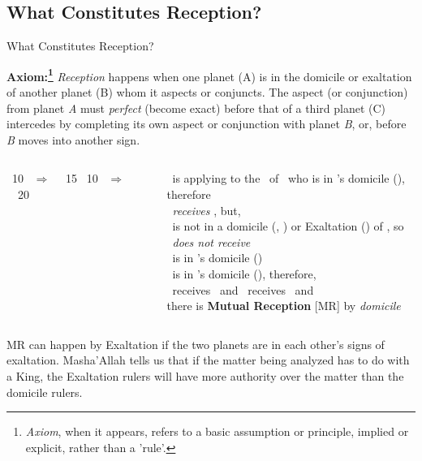\subsection{What Constitutes Reception?}
\begin{frame}[t]{What Constitutes Reception?}
\small
\begin{block}{}
\textbf{Axiom:\footnote{\textsl{Axiom}, when it appears, refers to a basic assumption or principle, implied or explicit, rather than a 'rule'.}} {
\textsl{Reception} happens when one planet (A) is in the domicile or exaltation of another planet (B) whom it aspects or conjuncts.
The aspect (or conjunction) from planet \textsl{A} must \textsl{perfect} (become exact)  before that of a third planet (C) intercedes by completing its own aspect or conjunction with planet \textsl{B}, or, before \textsl{B} moves into another sign.}
\end{block}

\vspace{0.1cm}
\begin{columns}[T, onlytextwidth]
\Mars\ 10 \Aries\ $\Rightarrow$ \Conjunction\ \Saturn\ 15 \Aries
\vspace{1.5cm}
\Mars\ 10 \Capricorn\ $\Rightarrow$ \Square\ \Saturn\ 20 \Aries

\rule{.1mm}{.4\textheight}

\Mars\ is applying to the \Conjunction\ of \Saturn\ who is in \Mars's domicile (\Aries), therefore\\
\Mars\ \textsl{receives} \Saturn, but, \\
\Mars\ is not in a domicile (\Capricorn, \Aquarius) or Exaltation (\Libra) of \Saturn, so \\
\Saturn\ \textsl{does not receive} \Mars \\
\vspace{0.1cm}
\ul
\Mars\ is in \Saturn's domicile (\Capricorn) \\
\Saturn\ is in \Mars's domicile (\Aries), therefore, \\
\Mars\ receives \Saturn\ and \Saturn\ receives \Mars\ and \\
there is \textbf{Mutual Reception} [MR] by \textsl{domicile}
\end{columns}
\vspace{0.2cm}
 MR can happen by Exaltation if the two planets are in each other's signs of exaltation. Masha'Allah tells us that if the matter being analyzed has to do with a King, the Exaltation rulers will have more authority over the matter than the domicile rulers.
\end{frame}